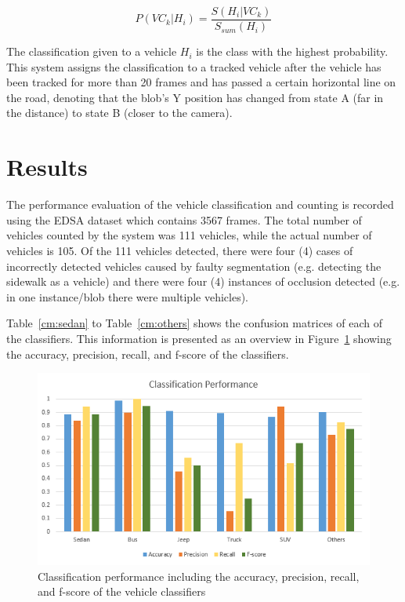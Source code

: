 \documentclass[conference]{IEEEtran}
\begin{document}
$$
P(VC_k | H_i) = \frac{S(H_i | VC_k)}{S_{sum} (H_i)}
$$


The classification given to a vehicle $H_i$ is the class with the highest probability. This system assigns the classification to a tracked vehicle after the vehicle has been tracked for more than 20 frames and has passed a certain horizontal line on the road, denoting that the blob's Y position has changed from state A (far in the distance) to state B (closer to the camera).

\section{Results}

The performance evaluation of the vehicle classification and counting is recorded using the EDSA dataset which contains 3567 frames. The total number of vehicles counted by the system was 111 vehicles, while the actual number of vehicles is 105. Of the 111 vehicles detected, there were four (4) cases of incorrectly detected vehicles caused by faulty segmentation (e.g. detecting the sidewalk as a vehicle) and there were four (4) instances of occlusion detected (e.g. in one instance/blob there were multiple vehicles).

Table~\ref{cm:sedan} to Table~\ref{cm:others} shows the confusion matrices of each of the classifiers. This information is presented as an overview in Figure~\ref{fig_classifier_performance} showing the accuracy, precision, recall, and f-score of the classifiers.

\begin{figure}[!ht]
\centering
\includegraphics[scale=0.8]{classification_performance.png}
\caption{Classification performance including the accuracy, precision, recall, and f-score of the vehicle classifiers}
\label{fig_classifier_performance}
\end{figure}
\end{document}
